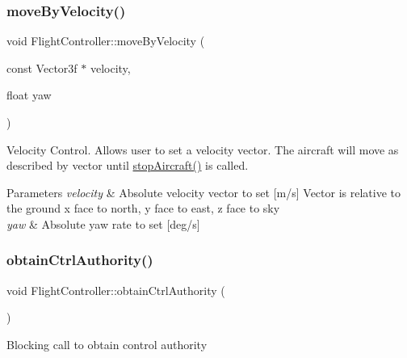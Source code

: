 \subsubsection{\texorpdfstring{move\+By\+Velocity()}{moveByVelocity()}}
{\footnotesize\ttfamily void Flight\+Controller\+::move\+By\+Velocity (\begin{DoxyParamCaption}\item[{const Vector3f $\ast$}]{velocity,  }\item[{float}]{yaw }\end{DoxyParamCaption})}

Velocity Control. Allows user to set a velocity vector. The aircraft will move as described by vector until \mbox{\hyperlink{class_m210_1_1_flight_controller_a60d0858a9cfd91bc362ec8b5b894d3b4}{stop\+Aircraft()}} is called. 
\begin{DoxyParams}{Parameters}
{\em velocity} & Absolute velocity vector to set \mbox{[}m/s\mbox{]} Vector is relative to the ground x face to north, y face to east, z face to sky \\
\hline
{\em yaw} & Absolute yaw rate to set \mbox{[}deg/s\mbox{]} \\
\hline
\end{DoxyParams}
\mbox{\label{class_m210_1_1_flight_controller_a922010e478d2e6cca4432fd076c8a857}} 
\subsubsection{\texorpdfstring{obtain\+Ctrl\+Authority()}{obtainCtrlAuthority()}}
{\footnotesize\ttfamily void Flight\+Controller\+::obtain\+Ctrl\+Authority (\begin{DoxyParamCaption}{ }\end{DoxyParamCaption})}

Blocking call to obtain control authority \mbox{\label{class_m210_1_1_flight_controller_a664a1699471956c2caa80321dc4f3dfd}} 
